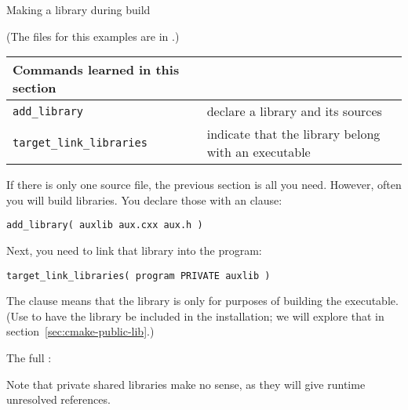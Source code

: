 \newpage
{} {Making a library during build}

(The files for this examples are in .)

\begin{tabular}{lp{3in}}
  \toprule
  Commands learned in this section\\
  \midrule
  \lstinline+add_library+&declare a library and its sources\\
  \lstinline+target_link_libraries+&indicate that the library belong with an executable\\
  \bottomrule
\end{tabular}

\begin{floatingfigure}[r]{2.5in}
  \begin{minipage}{2.5in}
  \end{minipage}
\end{floatingfigure}
%
If there is only one source file, the previous section is all you need.
However, often you will build libraries.
You declare those with an  clause:
\begin{lstlisting}
add_library( auxlib aux.cxx aux.h )
\end{lstlisting}
Next, you need to link that library into the program:
\begin{lstlisting}
target_link_libraries( program PRIVATE auxlib )
\end{lstlisting}
The  clause means that the library is only for
purposes of building the executable.
(Use  to have the library be included in the installation;
we will explore that in section~\ref{sec:cmake-public-lib}.)

The full :
%


Note that private shared libraries make no sense, as they will give
runtime unresolved references.

